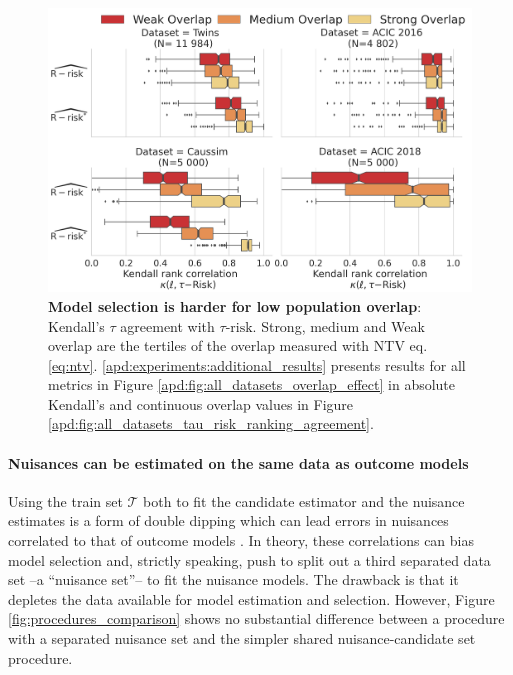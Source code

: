 \documentclass{report}
\begin{document}
\begin{figure}[h!]
  \begin{minipage}{.3\linewidth}
    \caption{\textbf{Model selection is harder for low population
        overlap}:
      Kendall's $\tau$ agreement with $\tau\text{-risk}$. Strong, medium and Weak overlap
      are the tertiles of the overlap measured with NTV eq. \ref{eq:ntv}. \ref{apd:experiments:additional_results} presents results for all
      metrics in Figure \ref{apd:fig:all_datasets_overlap_effect} in absolute
      Kendall's and continuous overlap values in Figure
        {\ref{apd:fig:all_datasets_tau_risk_ranking_agreement}}.}\label{fig:all_datasets_overlap_effect_r_risk}
  \end{minipage}
  \hfill
  \begin{minipage}{0.67\linewidth}
    \centering
    \includegraphics[width=\linewidth]{img/chapter_5/_2_overlap_influence_overlap_by_bin_comparaison_kendall_by_Dataset_r_risk_only.png}
  \end{minipage}
\end{figure}

\paragraph{Nuisances can be estimated on the same data as outcome models}

Using the train set $\mathcal{T}$ both to fit the candidate estimator and the
nuisance estimates is a form of double dipping which can lead errors in
nuisances correlated to that of outcome models
\citep{nie_quasioracle_2017}. In theory, these correlations can bias model
selection and, strictly speaking, push
to split out a third separated data set --a ``nuisance set''-- to fit the
nuisance models. The drawback is that it depletes the data available for
model estimation and selection. However, Figure
\ref{fig:procedures_comparison} shows no substantial difference between a procedure with a separated
nuisance set and the simpler shared nuisance-candidate set procedure.
\end{document}
